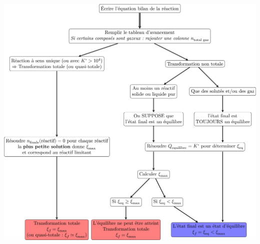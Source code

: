 \documentclass[../../main/main.tex]{subfiles}
\begin{document}
\begin{center}
	\includegraphics[width=\linewidth]{resume}
\end{center}
\end{document}

